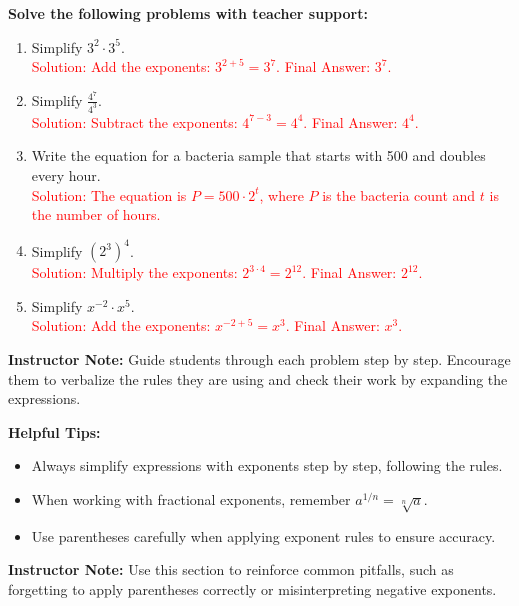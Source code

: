 \documentclass[12pt]{article}
\begin{document}
\vspace{1em}

\begin{tcolorbox}[colframe=black!60, colback=white, 
coltitle=black, colbacktitle=black!15, fonttitle=\bfseries\Large, 
title=Guided Practice, halign title=center, left=10pt, right=10pt, top=10pt, bottom=15pt]
\textbf{Solve the following problems with teacher support:}
\begin{enumerate}[itemsep=5em]
    \item Simplify \( 3^2 \cdot 3^5 \). \\
    \textcolor{red}{Solution: Add the exponents: \( 3^{2+5} = 3^7 \). Final Answer: \( 3^7 \).}
    \item Simplify \( \frac{4^7}{4^3} \). \\
    \textcolor{red}{Solution: Subtract the exponents: \( 4^{7-3} = 4^4 \). Final Answer: \( 4^4 \).}
    \item Write the equation for a bacteria sample that starts with 500 and doubles every hour. \\
    \textcolor{red}{Solution: The equation is \( P = 500 \cdot 2^t \), where \(P\) is the bacteria count and \(t\) is the number of hours.}
    \item Simplify \( (2^3)^4 \). \\
    \textcolor{red}{Solution: Multiply the exponents: \( 2^{3 \cdot 4} = 2^{12} \). Final Answer: \( 2^{12} \).}
    \item Simplify \( x^{-2} \cdot x^5 \). \\
    \textcolor{red}{Solution: Add the exponents: \( x^{-2+5} = x^3 \). Final Answer: \( x^3 \).}
\end{enumerate}

{\color{blue} \textbf{Instructor Note:} Guide students through each problem step by step. Encourage them to verbalize the rules they are using and check their work by expanding the expressions.}
\end{tcolorbox}

\vspace{1em}

\begin{tcolorbox}[colframe=black!40, colback=gray!5, 
coltitle=black, colbacktitle=black!20, fonttitle=\bfseries\Large, 
title=Additional Notes, halign title=center, left=5pt, right=5pt, top=5pt, bottom=15pt]
\textbf{Helpful Tips:}
\begin{itemize}
    \item Always simplify expressions with exponents step by step, following the rules.
    \item When working with fractional exponents, remember \( a^{1/n} = \sqrt[n]{a} \).
    \item Use parentheses carefully when applying exponent rules to ensure accuracy.
\end{itemize}

{\color{blue} \textbf{Instructor Note:} Use this section to reinforce common pitfalls, such as forgetting to apply parentheses correctly or misinterpreting negative exponents.}
\end{tcolorbox}
\end{document}
